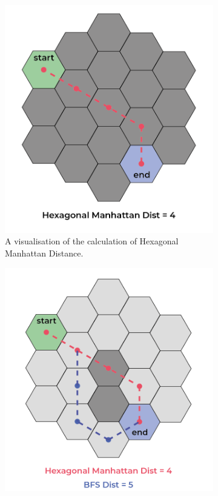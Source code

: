 \documentclass{article}
\begin{document}
\begin{figure}[]
    \centering
    \begin{subfigure}[b]{0.4\linewidth}
      \includegraphics[width=\linewidth]{hex-manhattan.png}
      \caption{A visualisation of the calculation of Hexagonal Manhattan Distance.}
      \label{fig: hex manhattan}
    \end{subfigure}
    \hspace{1cm}
    \begin{subfigure}[b]{0.42\linewidth}
      \includegraphics[width=\linewidth]{hex-manhattan-BFS-1.png}

\end{subfigure}
\end{figure}
\end{document}
